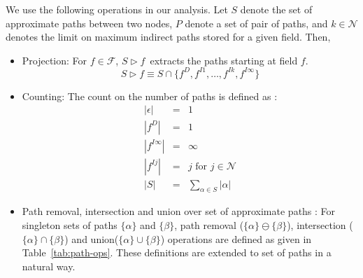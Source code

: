 \documentclass{sig-alternate}
\newcommand{\is}{\itemsep -1mm} %
\newcommand{\hide}[1]{} %
\newcommand{\drct}{\ensuremath{D}}
\newcommand{\indrct}{\ensuremath{I}}
\newcommand{\fields}{\ensuremath{\mathcal{F}}}
\newcommand{\nat}{\ensuremath{\mathcal{N}}}
\newcommand{\project}[2]{\ensuremath{#1\triangleright\!\!#2}}
\newcommand{\num}[1]{\ensuremath{|#1|}}
\newcommand{\remOne}[2]{\ensuremath{#1 \ominus #2}}
\begin{document}
We use the following operations in our analysis. Let $S$
denote the set of approximate paths between two nodes, $P$
denote a set of pair of paths, and $k \in \nat$ denotes the
limit on maximum indirect paths stored for a given
field. Then,
\begin{itemize}\is
\item Projection: For $f \in \fields$,
  \project{S}{f}\ extracts the paths starting at field $f$.
  $$\project{S}{f} \equiv S \cap \{f^{\drct}, f^{\indrct 1}, \ldots,
  f^{\indrct k}, f^{\indrct \infty}\}$$

\item Counting: The count on the number of paths is defined
  as :
  \begin{eqnarray*}
   \num{\epsilon} &=&     1 \\ %
   \num{f^{\drct}} &=&     1 \\
   \num{f^{\indrct\infty}} &=&     \infty \\
   \num{f^{\indrct j}} &=&  j \mbox{ for } j \in \nat  \\
   \num{S} &=&   \sum_{\alpha \in S}\num{\alpha}
  \end{eqnarray*}
\item Path removal, intersection and union over set of
  approximate paths : For singleton sets of paths
    $\{\alpha\}$ and $\{\beta\}$, path removal
    (\remOne{\{\alpha\}}{\{\beta\}}), intersection
    ($\{\alpha\} \cap \{\beta\}$) and union($\{\alpha\} \cup
    \{\beta\}$) operations are defined as given in
    Table~\ref{tab:path-ops}. These definitions are extended
    to set of paths in a natural way. \hide{(details in Sandeep's
    thesis~\cite{Sandeep11thesis}).}\\


\end{itemize}
\end{document}
